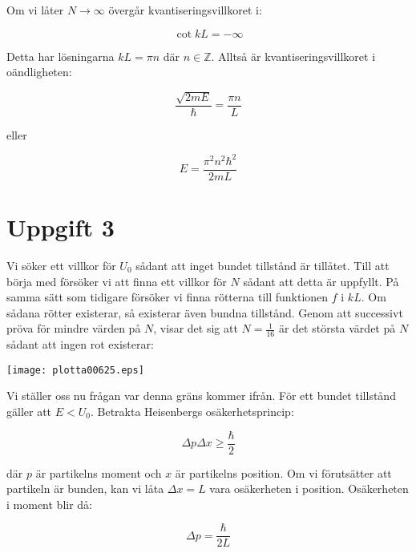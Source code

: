 \documentclass[12pt,a4paper]{article}
\begin{document}
Om vi låter $N\rightarrow\infty$ övergår kvantiseringsvillkoret i:

\begin{equation*}
\cot{kL}=-\infty
\end{equation*}

Detta har lösningarna $kL=\pi n$ där $n\in\mathbb{Z}$. Alltså är kvantiseringsvillkoret i oändligheten:

\begin{equation*}
\frac{\sqrt{2mE}}{\hbar}=\frac{\pi n}{L}
\end{equation*}

eller

\begin{equation*}
E=\frac{\pi^2n^2\hbar^2}{2mL}
\end{equation*}

\section*{Uppgift 3}

Vi söker ett villkor för $U_0$ sådant att inget bundet tillstånd är tillåtet. Till att börja med försöker vi att finna ett villkor för $N$ sådant att detta är uppfyllt. På samma sätt som tidigare försöker vi finna rötterna till funktionen $f$ i $kL$. Om sådana rötter existerar, så existerar även bundna tillstånd. Genom att successivt pröva för mindre värden på $N$, visar det sig att $N=\frac{1}{16}$ är det största värdet på $N$ sådant att ingen rot existerar:

\newpage

\begin{figure*}[h!]
\centering
\texttt{[image: plotta00625.eps]}
\caption*{$N=\frac{1}{16}$}
\end{figure*}

Vi ställer oss nu frågan var denna gräns kommer ifrån. För ett bundet tillstånd gäller att $E<U_0$. Betrakta Heisenbergs osäkerhetsprincip:

\begin{equation*}
\Delta p\Delta x\ge\frac{\hbar}{2}
\end{equation*}

där $p$ är partikelns moment och $x$ är partikelns position. Om vi förutsätter att partikeln är bunden, kan vi låta $\Delta x=L$ vara osäkerheten i position. Osäkerheten i moment blir då:

\begin{equation*}
\Delta p=\frac{\hbar}{2L}
\end{equation*}
\end{document}

